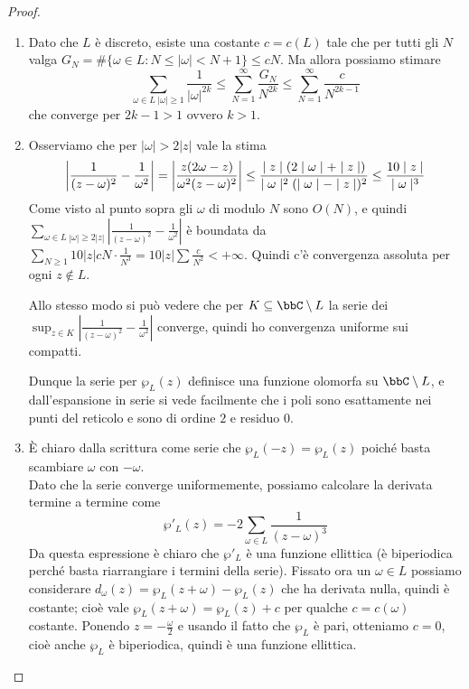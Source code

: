 \begin{proof}$ $
    \begin{enumerate}
        \item Dato che $L$ è discreto, esiste una costante $c=c(L)$ tale che per tutti gli $N$ valga $G_N=\#\{\omega\in L : N\le |\omega|<N+1\}\le cN$. Ma allora possiamo stimare $$\sum_{\omega\in L\ |\omega|\ge1}\dfrac1{|\omega|^{2k}}\le \sum_{N=1}^\infty \dfrac{G_N}{N^{2k}}\le \sum_{N=1}^\infty \dfrac{c}{N^{2k-1}}$$ che converge per $2k-1>1$ ovvero $k>1$.

        \item Osserviamo che per $|\omega|>2|z|$ vale la stima $$ \left|\frac{1}{(z-\omega)^2}-\frac{1}{\omega^2}\right| = \left|\frac{z(2\omega-z)}{\omega^2(z-\omega)^2}\right| \le \frac{\mid z \mid(2\mid \omega \mid+\mid z \mid)}{\mid \omega \mid^2(\mid \omega \mid-\mid z \mid)^2} \le \frac{10\mid z \mid}{\mid \omega \mid^3} $$
        Come visto al punto sopra gli $\omega$ di modulo $N$ sono $O(N)$, e quindi $\displaystyle\sum_{\omega\in L\ |\omega|\ge2|z|}\left|\frac{1}{(z-\omega)^2}-\frac{1}{\omega^2}\right|$ è boundata da $\sum_{N\ge1} 10|z|cN\cdot\frac{1}{N^3}=10|z|\sum\frac{c}{N^2}<+\infty$. Quindi c'è convergenza assoluta per ogni $z\not\in L$.

        Allo stesso modo si può vedere che per $K\subseteq\bbC\setminus L$ la serie dei  $\sup_{z\in K}\left|\frac{1}{(z-\omega)^2}-\frac{1}{\omega^2}\right|$ converge, quindi ho convergenza uniforme sui compatti.

        Dunque la serie per $\wp_L(z)$ definisce una funzione olomorfa su $\bbC\setminus L$, e dall'espansione in serie si vede facilmente che i poli sono esattamente nei punti del reticolo e sono di ordine $2$ e residuo $0$.

        \item È chiaro dalla scrittura come serie che $\wp_L(-z)=\wp_L(z)$ poiché basta scambiare $\omega$ con $-\omega$.\\
        Dato che la serie converge uniformemente, possiamo calcolare la derivata termine a termine come $$ \wp'_L(z)=-2\sum_{\omega\in L}\frac1{(z-\omega)^3} $$
        Da questa espressione è chiaro che $\wp'_L$ è una funzione ellittica (è biperiodica perché basta riarrangiare i termini della serie). Fissato ora un $\omega\in L$ possiamo considerare $d_\omega(z)=\wp_L(z+\omega)-\wp_L(z)$ che ha derivata nulla, quindi è costante; cioè vale $\wp_L(z+\omega)=\wp_L(z)+c$ per qualche $c=c(\omega)$ costante. Ponendo $z=-\frac\omega2$ e usando il fatto che $\wp_L$ è pari, otteniamo $c=0$, cioè anche $\wp_L$ è biperiodica, quindi è una funzione ellittica.
    \end{enumerate}
\end{proof}

